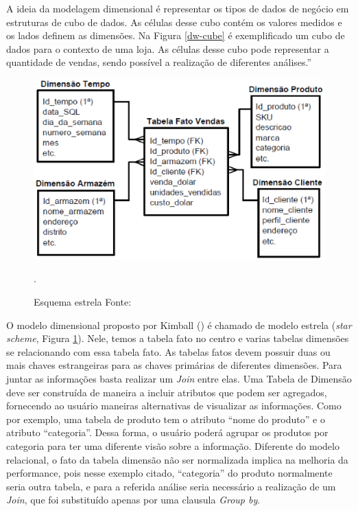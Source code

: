 A ideia da modelagem dimensional é representar os tipos de dados de negócio em estruturas de cubo de dados. As células desse cubo contém os valores medidos e os lados definem as dimensões. Na Figura \ref{dw-cube} é exemplificado um cubo de dados para o contexto de uma loja. As células desse cubo pode representar a quantidade de vendas, sendo possível a realização de diferentes análises.''

 \begin{figure}[!htb]
 	\centering
 		\includegraphics[scale=0.8]{figuras/dw-Modelo-estrela}
 		\caption{Esquema estrela Fonte: \cite{Wagner2012}}.
 		\label{dw-starscheme}
 \end{figure}

O modelo dimensional proposto por Kimball (\citeyear{kimball2002}) é chamado de modelo estrela (\emph{star scheme}, Figura \ref{dw-starscheme}). Nele, temos a tabela fato no centro e varias tabelas dimensões se relacionando com essa tabela fato. As tabelas fatos devem possuir duas ou mais chaves estrangeiras para as chaves primárias de diferentes dimensões. Para juntar as informações basta realizar um \emph{Join} entre elas.
%
Uma Tabela de Dimensão deve ser construída de maneira a incluir atributos que podem ser agregados, fornecendo ao usuário maneiras alternativas de visualizar as informações. Como por exemplo, uma tabela de produto tem o atributo “nome do produto” e o atributo “categoria”. Dessa forma, o usuário poderá agrupar os produtos por categoria para ter uma diferente visão sobre a informação. Diferente do modelo relacional, o fato da tabela dimensão não ser normalizada implica na melhoria da performance, pois nesse exemplo citado, “categoria” do produto normalmente seria outra tabela, e para a referida análise seria necessário a realização de um \emph{Join}, que foi substituído apenas por uma clausula \emph{Group by}.

